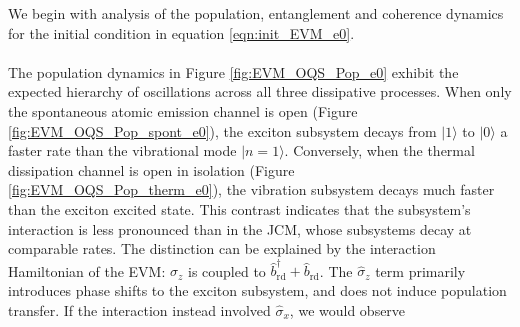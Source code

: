 \documentclass[11pt]{article}
\newcounter{subsubsubsection}[subsubsection]
\begin{document}

We begin with analysis of the population, entanglement and coherence dynamics for the initial condition in equation \ref{eqn:init_EVM_e0}.\\
\\
The population dynamics in Figure \ref{fig:EVM_OQS_Pop_e0} exhibit the expected hierarchy of oscillations across all three dissipative processes. When only the spontaneous atomic emission channel is open (Figure \ref{fig:EVM_OQS_Pop_spont_e0}), the exciton subsystem decays from $|1\rangle$ to $|0\rangle$ a faster rate than the vibrational mode $|n=1\rangle$. Conversely, when the thermal dissipation channel is open in isolation (Figure \ref{fig:EVM_OQS_Pop_therm_e0}), the vibration subsystem decays much faster than the exciton excited state. This contrast indicates that the subsystem's interaction is less pronounced than in the JCM, whose subsystems decay at comparable rates. The distinction can be explained by the interaction Hamiltonian of the EVM: $\hat{\sigma}_z$ is coupled to $\hat{b}_{\scriptscriptstyle \text{rd}}^\dagger + \hat{b}_{\scriptscriptstyle \text{rd}}$. The $\hat{\sigma}_z$ term primarily introduces phase shifts to the exciton subsystem, and does not induce population transfer. If the interaction instead involved $\hat{\sigma}_x$, we would observe
\end{document}
